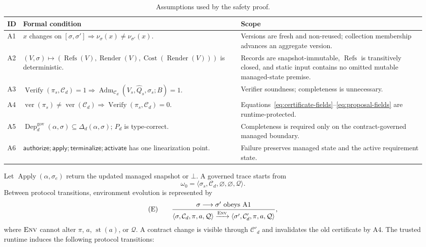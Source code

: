 \begin{table}[H]
\centering
\normalsize
\renewcommand{\arraystretch}{1.16}
\caption{Assumptions used by the safety proof.}
\begin{tabularx}{0.94\textwidth}{@{}p{} X X@{}}
\toprule
\textbf{ID} & \textbf{Formal condition} & \textbf{Scope} \\
\midrule
A1 & $x$ changes on $[\sigma,\sigma']\Rightarrow\nu_\sigma(x)\ne\nu_{\sigma'}(x)$. & Versions are fresh and non-reused; collection membership advances an aggregate version. \\
A2 & $(V,\sigma)\mapsto(\operatorname{Refs}(V),\operatorname{Render}(V),\operatorname{Cost}(\operatorname{Render}(V)))$ is deterministic. & Records are snapshot-immutable, $\operatorname{Refs}$ is transitively closed, and static input contains no omitted mutable managed-state premise. \\
A3 & $\operatorname{Verify}(\pi_s,\mathcal C_d)=1\Rightarrow\operatorname{Adm}_{\mathcal C_d}(V_s,\widehat Q_s,\sigma_s;B)=1$. & Verifier soundness; completeness is unnecessary. \\
A4 & $\operatorname{ver}(\pi_s)\ne\operatorname{ver}(\mathcal C_d)\Rightarrow\operatorname{Verify}(\pi_s,\mathcal C_d)=0$. & Equations~\eqref{eq:certificate-fields}--\eqref{eq:proposal-fields} are runtime-protected. \\
A5 & $\operatorname{Dep}^{\mathrm{gov}}_d(\alpha,\sigma)\subseteq\Delta_d(\alpha,\sigma)$; $P_d$ is type-correct. & Completeness is required only on the contract-governed managed boundary. \\
A6 & $\mathsf{authorize};\mathsf{apply};\mathsf{terminalize};\mathsf{activate}$ has one linearization point. & Failure preserves managed state and the active requirement state. \\
\bottomrule
\end{tabularx}
\end{table}
Let $\operatorname{Apply}(\alpha,\sigma_e)$ return the updated managed snapshot or $\bot$. A governed trace starts from
\[
\omega_0=\langle\sigma_s,\mathcal C_d,\varnothing,\varnothing,\mathcal Q\rangle .
\]
Between protocol transitions, environment evolution is represented by
\begin{equation*}
\textup{(E)}\qquad
\frac{\sigma\longrightarrow\sigma'\ \text{obeys A1}}
{\langle\sigma,\mathcal C_d,\pi,a,\mathcal Q\rangle
\xrightarrow{\textsc{Env}}
\langle\sigma',\mathcal C'_d,\pi,a,\mathcal Q\rangle},
\end{equation*}
where $\textsc{Env}$ cannot alter $\pi$, $a$, $\operatorname{st}(a)$, or $\mathcal Q$. A contract change is visible through $\mathcal C'_d$ and invalidates the old certificate by A4. The trusted runtime induces the following protocol transitions:

